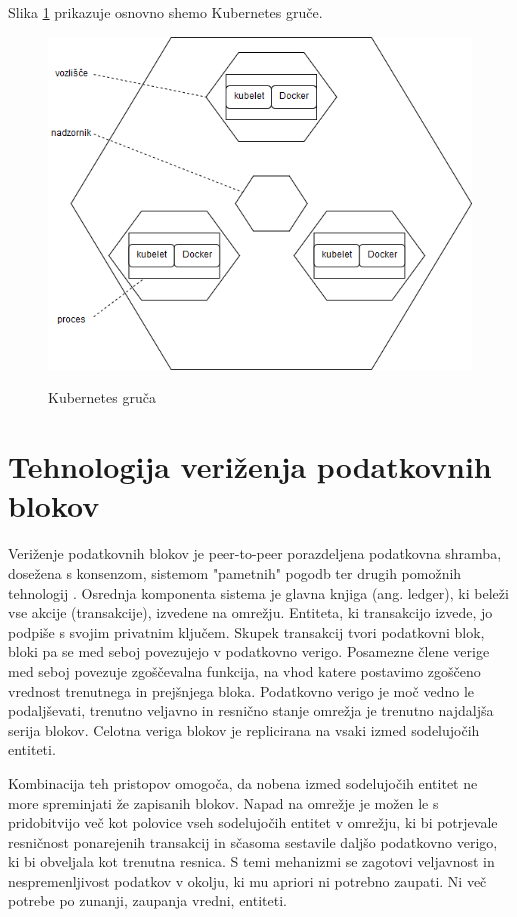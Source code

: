 \documentclass[a4paper, 12pt]{book}
\begin{document}
Slika \ref{kubernetes_cluster} prikazuje osnovno shemo Kubernetes gruče.

\begin{figure}[h]
	\includegraphics[width=1.0\textwidth]{slike/kubernetes_cluster.png}
	\label{kubernetes_cluster}
	\caption{Kubernetes gruča}
\end{figure}


\chapter{Tehnologija veriženja podatkovnih blokov}
\label{ch2}

Veriženje podatkovnih blokov je peer-to-peer porazdeljena podatkovna shramba, dosežena s konsenzom, sistemom "pametnih" pogodb ter drugih pomožnih tehnologij \cite{hyperledgerWeb}. Osrednja komponenta sistema je glavna knjiga (ang. ledger), ki beleži vse akcije (transakcije), izvedene na omrežju. \cite{hyperledgerDocs}
Entiteta, ki transakcijo izvede, jo podpiše s svojim privatnim ključem.
Skupek transakcij tvori podatkovni blok, bloki pa se med seboj povezujejo v podatkovno verigo.
Posamezne člene verige med seboj povezuje zgoščevalna funkcija, na vhod katere postavimo zgoščeno vrednost trenutnega in prejšnjega bloka.
Podatkovno verigo je moč vedno le podaljševati, trenutno veljavno in resnično stanje omrežja je trenutno najdaljša serija blokov.
Celotna veriga blokov je replicirana na vsaki izmed sodelujočih entiteti.

Kombinacija teh pristopov omogoča, da nobena izmed sodelujočih entitet ne more spreminjati že zapisanih blokov.
Napad na omrežje je možen le s pridobitvijo več kot polovice vseh sodelujočih entitet v omrežju, ki bi potrjevale resničnost ponarejenih transakcij in sčasoma sestavile daljšo podatkovno verigo, ki bi obveljala kot trenutna resnica.
S temi mehanizmi se zagotovi veljavnost in nespremenljivost podatkov v okolju, ki mu apriori ni potrebno zaupati.
Ni več potrebe po zunanji, zaupanja vredni, entiteti.
\end{document}
